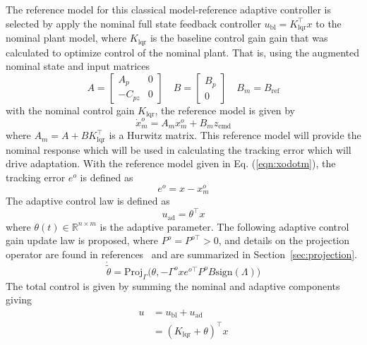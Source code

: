 The reference model for this classical model-reference adaptive controller is selected by apply the nominal full state feedback controller $u_{\text{bl}}=K_{\text{lqr}}^{\top}x$ to the nominal plant model, where $K_{\text{lqr}}$ is the baseline control gain gain that was calculated to optimize control of the nominal plant.
That is, using the augmented nominal state and input matrices
\begin{equation*}
  A=
  \begin{bmatrix}
    A_{p} & 0 \\
    -C_{pz} & 0
  \end{bmatrix} \quad
  B=
  \begin{bmatrix}
    B_{p} \\
    0
  \end{bmatrix} \quad
  B_{m}=B_{\text{ref}}
\end{equation*}
with the nominal control gain $K_{\text{lqr}}$, the reference model is given by
\begin{equation}
  \label{eqn:xodotm}
  \dot{x}_{m}^{o}=A_{m}x_{m}^{o}+B_{m}z_{\text{cmd}}
\end{equation}
where $A_{m}=A+BK_{\text{lqr}}^{\top}$ is a Hurwitz matrix.
This reference model will provide the nominal response which will be used in calculating the tracking error which will drive adaptation.
With the reference model given in Eq. (\ref{eqn:xodotm}), the tracking error $e^{o}$ is defined as
\begin{equation}
  \label{eqn:eoerror}
  e^{o}=x-x_{m}^{o}
\end{equation}
The adaptive control law is defined as
\begin{equation}
  \label{eqn:uadporm}
  u_{\text{ad}}=\theta^{\top}x
\end{equation}
where $\theta(t) \in \mathbb{R}^{n\times m}$ is the adaptive parameter.
The following adaptive control gain update law is proposed, where $P^{o}=P^{o\top}>0$, and details on the projection operator are found in references\ \cite{lavretskywise.book.2013,PometPraly.1992} and are summarized in Section~\ref{sec:projection}.
\begin{equation}
  \label{eqn:ormupdatelaw}
  \dot{\tilde{\theta}}=\text{Proj}_{\Gamma}\bigr(\theta,-\Gamma^{o} xe^{o\top}P^{o}B\text{sign}(\Lambda)\bigr)
\end{equation}
The total control is given by summing the nominal and adaptive components giving
\begin{equation}
  \label{eqn:utotal}
  \begin{split}
    u&=u_{\text{bl}}+u_{\text{ad}} \\
    &=(K_{\text{lqr}}+\theta)^{\top}x
  \end{split}
\end{equation}
